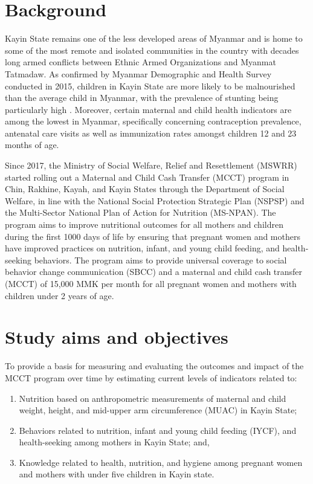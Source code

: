 \documentclass[12pt,a4paper]{article}
\begin{document}
\newpage

\hypertarget{background}{%
\section{Background}\label{background}}

Kayin State remains one of the less developed areas of Myanmar and is home to some of the most remote and isolated communities in the country with decades long armed conflicts between Ethnic Armed Organizations and Myanmat Tatmadaw. As confirmed by Myanmar Demographic and Health Survey conducted in 2015, children in Kayin State are more likely to be malnourished than the average child in Myanmar, with the prevalence of stunting being particularly high \citep{MinistryofHealthandSports-MoHS/Myanmar2017}. Moreover, certain maternal and child health indicators are among the lowest in Myanmar, specifically concerning contraception prevalence, antenatal care visits as well as immunization rates amongst children 12 and 23 months of age.

Since 2017, the Ministry of Social Welfare, Relief and Resettlement (MSWRR) started rolling out a Maternal and Child Cash Transfer (MCCT) program in Chin, Rakhine, Kayah, and Kayin States through the Department of Social Welfare, in line with the National Social Protection Strategic Plan (NSPSP) and the Multi-Sector National Plan of Action for Nutrition (MS-NPAN). The program aims to improve nutritional outcomes for all mothers and children during the first 1000 days of life by ensuring that pregnant women and mothers have improved practices on nutrition, infant, and young child feeding, and health-seeking behaviors. The program aims to provide universal coverage to social behavior change communication (SBCC) and a maternal and child cash transfer (MCCT) of 15,000 MMK per month for all pregnant women and mothers with children under 2 years of age.

\hypertarget{objectives}{%
\section{Study aims and objectives}\label{objectives}}

To provide a basis for measuring and evaluating the outcomes and impact of the MCCT program over time by estimating current levels of indicators related to:

\begin{enumerate}
\def\labelenumi{\arabic{enumi}.}
\item
  Nutrition based on anthropometric measurements of maternal and child weight, height, and mid-upper arm circumference (MUAC) in Kayin State;
\item
  Behaviors related to nutrition, infant and young child feeding (IYCF), and health-seeking among mothers in Kayin State; and,
\item
  Knowledge related to health, nutrition, and hygiene among pregnant women and mothers with under five children in Kayin state.
\end{enumerate}
\end{document}

